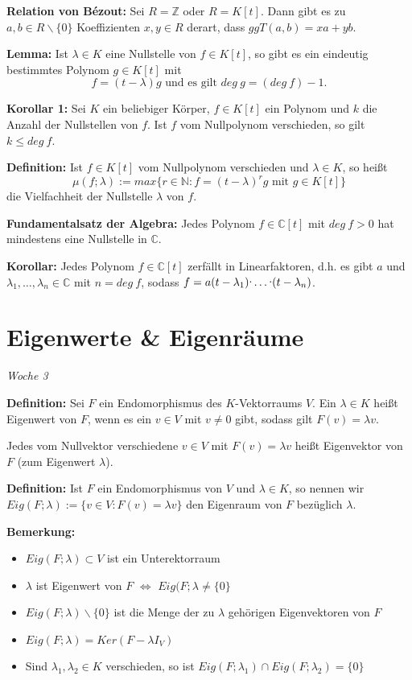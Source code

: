 \documentclass{article}
\let\oldcdot\cdot
\renewcommand{\cdot}{\raisebox{0.1ex}{$\oldcdot$}}
\begin{document}
\textbf{Relation von Bézout:} Sei $R=\mathbb{Z}$ oder $R=K[t]$. Dann gibt es zu
$a,b\in R\backslash \{0\}$ Koeffizienten $x,y\in R$ derart, dass $ggT(a,b) = xa
+yb$.

\textbf{Lemma:} Ist $\lambda\in K$ eine Nullstelle von $f\in K[t]$, so gibt es
ein eindeutig bestimmtes Polynom $g\in K[t]$ mit 
\begin{equation*}
	f=(t-\lambda)g\text{ und es gilt } deg\ g=(deg\ f)-1.
\end{equation*}

\textbf{Korollar 1:} Sei $K$ ein beliebiger Körper, $f\in K[t]$ ein Polynom und
$k$ die Anzahl der Nullstellen von $f$. Ist $f$ vom Nullpolynom verschieden, so
gilt $k\leq deg\ f$.

\textbf{Definition:} Ist $f\in K[t]$ vom Nullpolynom verschieden und
$\lambda\in K$, so heißt 
\begin{equation*}
\mu(f;\lambda):=max\{r\in\mathbb{N}: f=(t-\lambda)^rg \text{ mit } g\in K[t]\}
\end{equation*}
die Vielfachheit der Nullstelle $\lambda$ von $f$.

\textbf{Fundamentalsatz der Algebra:} Jedes Polynom $f\in \mathbb{C}[t]$ mit
$deg\ f>0$ hat mindestens eine Nullstelle in $\mathbb{C}$.

\textbf{Korollar:} Jedes Polynom $f\in\mathbb{C}[t]$ zerfällt in
Linearfaktoren, d.h. es gibt $a$ und $\lambda_1, \dots, \lambda_n\in\mathbb{C}$
mit $n=deg\ f$, sodass $f=a(t-\lambda_1)\cdot\dots \cdot (t-\lambda_n)$.

\section{Eigenwerte \& Eigenräume}

\textit{\small \hspace{-1.5cm}Woche 3}

\textbf{Definition:} Sei $F$ ein Endomorphismus des $K$-Vektorraums $V$. Ein
$\lambda\in K$ heißt Eigenwert von $F$, wenn es ein $v\in V$ mit $v\neq0$ gibt,
sodass gilt $F(v) = \lambda v$. 

Jedes vom Nullvektor verschiedene $v\in V$ mit $F(v)=\lambda v$ heißt
Eigenvektor von $F$ (zum Eigenwert $\lambda$).

\textbf{Definition:} Ist $F$ ein Endomorphismus von $V$ und $\lambda\in K$, so
nennen wir $Eig(F;\lambda):=\{v\in V:F(v)=\lambda v\}$ den Eigenraum von $F$
bezüglich $\lambda$.

\textbf{Bemerkung:} 
\begin{itemize}
\item[a)] $Eig(F;\lambda)\subset V$ ist ein Unterektorraum
\item[b)] $\lambda$ ist Eigenwert von $F$ $\Leftrightarrow$
	$Eig(F;\lambda\neq\{0\}$
\item[c)] $Eig(F;\lambda)\backslash\{0\}$ ist die Menge der zu $\lambda$
	gehörigen Eigenvektoren von $F$
\item[d)] $Eig(F;\lambda) = Ker(F-\lambda I_V)$
\item[e)] Sind $\lambda_1,\lambda_2\in K$ verschieden, so ist
	$Eig(F;\lambda_1)\cap Eig(F;\lambda_2)=\{0\}$
\end{itemize}
\end{document}
